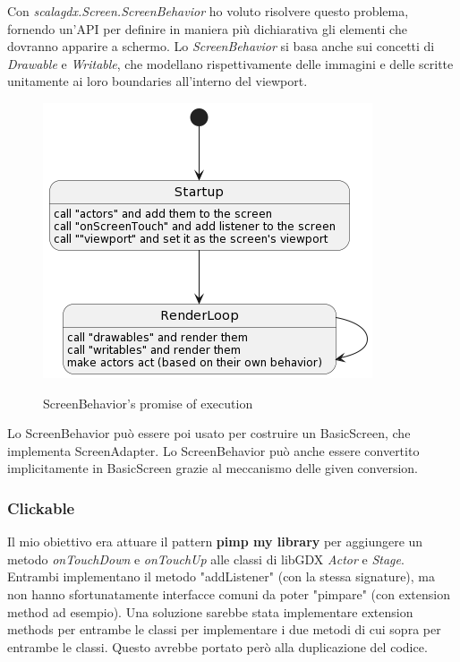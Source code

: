 Con \textit{scalagdx.Screen.ScreenBehavior} ho voluto risolvere questo problema, fornendo un'API per definire in maniera più dichiarativa gli elementi che dovranno apparire a schermo. Lo \textit{ScreenBehavior} si basa anche sui concetti di \textit{Drawable} e \textit{Writable}, che modellano rispettivamente delle immagini e delle scritte unitamente ai loro boundaries all'interno del viewport.



\begin{figure}[H]
    \centering
    \caption{ScreenBehavior's promise of execution}
    \includegraphics[width=0.8\linewidth]{images/screen-behavior.png}
    \label{ScreenBehavior}
\end{figure}


Lo ScreenBehavior può essere poi usato per costruire un BasicScreen, che implementa ScreenAdapter. Lo ScreenBehavior può anche essere convertito implicitamente in BasicScreen grazie al meccanismo delle given conversion.


\subsubsection{Clickable}
Il mio obiettivo era attuare il pattern \textbf{pimp my library} per aggiungere un metodo \textit{onTouchDown} e \textit{onTouchUp} alle classi di libGDX \textit{Actor} e \textit{Stage}.
Entrambi implementano il metodo "addListener" (con la stessa signature), ma non hanno sfortunatamente interfacce comuni da poter "pimpare" (con extension method ad esempio).
Una soluzione sarebbe stata implementare extension methods per entrambe le classi per implementare i due metodi di cui sopra per entrambe le classi. Questo avrebbe portato però alla duplicazione del codice.

